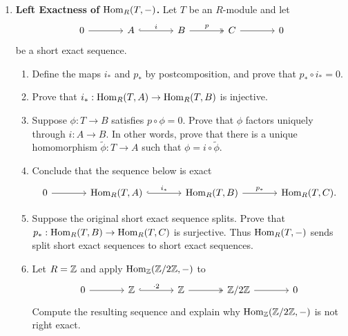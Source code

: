 \documentclass[12pt,reqno]{amsart}
\begin{document}
\begin{enumerate}[leftmargin=*, resume=problems]

\item \textbf{Left Exactness of $\operatorname{Hom}_R(T,-)$.} Let $T$ be an $R$-module and let
\[
\begin{tikzcd}[column sep=large]
0 \arrow[r] & A \arrow[r, hook, "i"] & B \arrow[r, two heads, "p"] & C \arrow[r] & 0
\end{tikzcd}
\]
be a short exact sequence.
\begin{enumerate}
\item Define the maps $i_*$ and $p_*$ by postcomposition, and prove that $p_*\circ i_*=0$.
\item Prove that $i_*:\operatorname{Hom}_R(T,A)\to \operatorname{Hom}_R(T,B)$ is injective.
\item Suppose $\phi:T\to B$ satisfies $p\circ \phi=0$. Prove that $\phi$ factors uniquely through $i:A\to B$. In other words, prove that there is a unique homomorphism $\widetilde{\phi}:T\to A$ such that $\phi=i\circ \widetilde{\phi}$.
\item Conclude that the sequence below is exact
\[
\begin{tikzcd}[column sep=large]
0 \arrow[r] & \Hom_R(T,A) \arrow[r, hook, "i_*"] & \Hom_R(T,B) \arrow[r, "p_*"] & \Hom_R(T,C).
\end{tikzcd}
\]
\item Suppose the original short exact sequence splits. Prove that $p_*:\operatorname{Hom}_R(T,B)\to \operatorname{Hom}_R(T,C)$ is surjective. Thus $\operatorname{Hom}_R(T,-)$ sends split short exact sequences to short exact sequences.
\item Let $R=\mathbb{Z}$ and apply $\operatorname{Hom}_{\mathbb{Z}}(\mathbb{Z}/2\mathbb{Z},-)$ to
\[
\begin{tikzcd}[column sep=large]
0 \arrow[r] & \ZZ \arrow[r, hook, "\cdot 2"] & \ZZ \arrow[r, two heads] & \ZZ/2\ZZ \arrow[r] & 0
\end{tikzcd}
\]
Compute the resulting sequence and explain why $\operatorname{Hom}_{\mathbb{Z}}(\mathbb{Z}/2\mathbb{Z},-)$ is not right exact.
\end{enumerate}


\end{enumerate}
\end{document}
